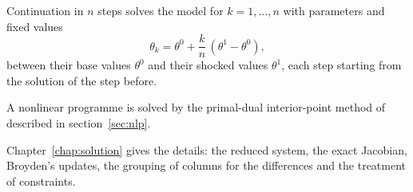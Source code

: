 Continuation in $n$ steps solves the model for $k = 1, \dots, n$ with
parameters and fixed values
\begin{equation*}
\theta_k = \theta^0 + \frac{k}{n}\,(\theta^1 - \theta^0),
\end{equation*}
between their base values $\theta^0$ and their shocked values $\theta^1$, each
step starting from the solution of the step before.

A nonlinear programme is solved by the primal-dual interior-point method of
\citet{wachter2006} described in section~\ref{sec:nlp}.

Chapter~\ref{chap:solution} gives the details: the reduced system, the
exact Jacobian, Broyden's updates, the grouping of columns for the differences
and the treatment of constraints.


\begin{alsosee}
\end{alsosee}
